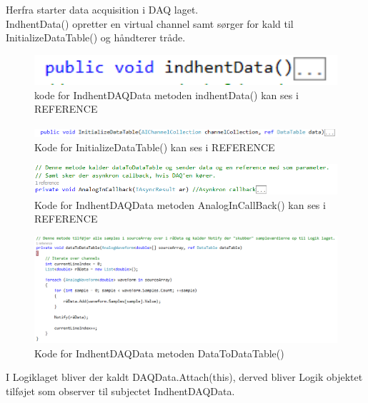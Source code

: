 Herfra starter data acquisition i DAQ laget.
\\ IndhentData() opretter en virtual channel samt sørger for kald til InitializeDataTable() og håndterer tråde.

\begin{figure}[H]
	\centering
	\includegraphics[width=1.0\textwidth]{FigurerProgram/indhentDataDaq}
	\caption{kode for IndhentDAQData metoden indhentData() kan ses i REFERENCE}
\end{figure}

\begin{figure}[H]
	\centering
	\includegraphics[width=1.0\textwidth]{FigurerProgram/InitiDaq}
	\caption{Kode for InitializeDataTable() kan ses i REFERENCE}
\end{figure}

\begin{figure}[H]
	\centering
	\includegraphics[width=1.0\textwidth]{FigurerProgram/CallBackDaq}
	\caption{Kode for IndhentDAQData metoden AnalogInCallBack() kan ses i REFERENCE}
\end{figure}

\begin{figure}[H]
	\centering
	\includegraphics[width=1.0\textwidth]{FigurerProgram/dtdDaq}
	\caption{Kode for IndhentDAQData metoden DataToDataTable()}
\end{figure}

I Logiklaget bliver der kaldt DAQData.Attach(this), derved bliver Logik objektet tilføjet som observer til subjectet IndhentDAQData.

